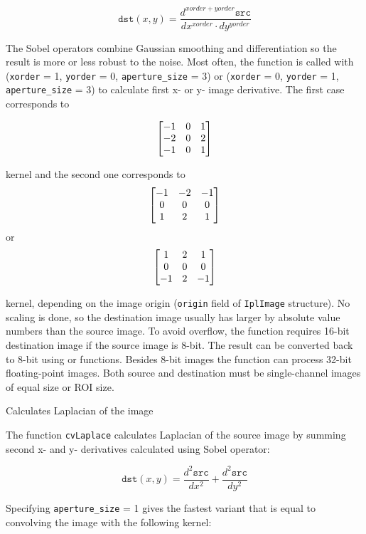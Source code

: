 \[
\texttt{dst}(x,y) = \frac{d^{xorder+yorder} \texttt{src}}{dx^{xorder} \cdot dy^{yorder}}
\]

The Sobel operators combine Gaussian smoothing and differentiation
so the result is more or less robust to the noise. Most often,
the function is called with (\texttt{xorder} = 1, \texttt{yorder} = 0,
\texttt{aperture\_size} = 3) or (\texttt{xorder} = 0, \texttt{yorder} = 1,
\texttt{aperture\_size} = 3) to calculate first x- or y- image
derivative. The first case corresponds to

\[ \begin{bmatrix} -1 & 0 & 1\\ -2 & 0 & 2\\ -1 & 0 & 1 \end{bmatrix}
\]

kernel and the second one corresponds to
\[ \begin{bmatrix} -1 & -2 & -1\\ 0 & 0 & 0\\ 1 & 2 & 1 \end{bmatrix}
\]
or
\[ \begin{bmatrix} 1 & 2 & 1\\ 0 & 0 & 0\\ -1 & 2 & -1 \end{bmatrix}
\]

kernel, depending on the image origin (\texttt{origin} field of
\texttt{IplImage} structure). No scaling is done, so the destination image
usually has larger by absolute value numbers than the source image. To
avoid overflow, the function requires 16-bit destination image if the
source image is 8-bit. The result can be converted back to 8-bit using
 or  functions. Besides 8-bit images
the function can process 32-bit floating-point images. Both source and
destination must be single-channel images of equal size or ROI size.

\label{Laplace}
\label{Laplace}
Calculates Laplacian of the image

\begin{description}
\end{description}

The function \texttt{cvLaplace} calculates Laplacian of the source image by summing second x- and y- derivatives calculated using Sobel operator:

\[
\texttt{dst}(x,y) = \frac{d^2 \texttt{src}}{dx^2} + \frac{d^2 \texttt{src}}{dy^2}
\]

Specifying \texttt{aperture\_size} = 1 gives the fastest variant that is equal to convolving the image with the following kernel:

